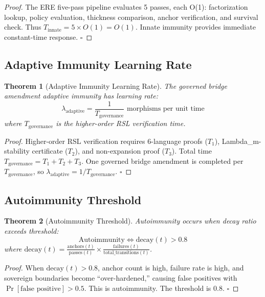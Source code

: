 \documentclass[11pt,a4paper]{article}
\newtheorem{theorem}{Theorem}[section]
\begin{document}
\begin{proof}
The ERE five-pass pipeline evaluates 5 passes, each O(1): factorization lookup, policy evaluation, thickness comparison, anchor verification, and survival check. Thus $T_{\text{innate}} = 5 \times O(1) = O(1)$. Innate immunity provides immediate constant-time response. \hfill$\square$
\end{proof}

\subsection{Adaptive Immunity Learning Rate}

\begin{theorem}[Adaptive Immunity Learning Rate]\label{thm:adaptive_learning}
The governed bridge amendment adaptive immunity has learning rate:
\begin{equation}
\lambda_{\text{adaptive}} = \frac{1}{T_{\text{governance}}} \text{ morphisms per unit time}
\end{equation}
where $T_{\text{governance}}$ is the higher-order RSL verification time.
\end{theorem}

\begin{proof}
Higher-order RSL verification requires 6-language proofs ($T_1$), Lambda_m-stability certificate ($T_2$), and non-expansion proof ($T_3$). Total time $T_{\text{governance}} = T_1 + T_2 + T_3$. One governed bridge amendment is completed per $T_{\text{governance}}$, so $\lambda_{\text{adaptive}} = 1/T_{\text{governance}}$. \hfill$\square$
\end{proof}

\subsection{Autoimmunity Threshold}

\begin{theorem}[Autoimmunity Threshold]\label{thm:autoimmunity}
Autoimmunity occurs when decay ratio exceeds threshold:
\begin{equation}
\text{Autoimmunity} \iff \text{decay}(t) > 0.8
\end{equation}
where $\text{decay}(t) = \frac{\text{anchors}(t)}{\text{passes}(t)} \times \frac{\text{failures}(t)}{\text{total\_transitions}(t)}$.
\end{theorem}

\begin{proof}
When $\text{decay}(t) > 0.8$, anchor count is high, failure rate is high, and sovereign boundaries become ``over-hardened,'' causing false positives with $\Pr[\text{false positive}] > 0.5$. This is autoimmunity. The threshold is 0.8. \hfill$\square$
\end{proof}
\end{document}
